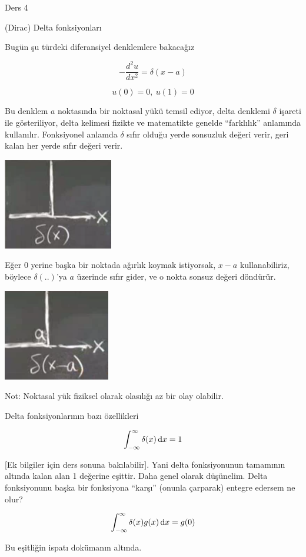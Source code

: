 \documentclass[12pt,fleqn]{article}\usepackage{../../common}
\begin{document}
Ders 4

(Dirac) Delta fonksiyonları

Bugün şu türdeki diferansiyel denklemlere bakacağız

$$ -\frac{d^2u}{dx^2}=\delta(x-a) $$

$$ u(0) = 0, \ u(1) = 0 $$

Bu denklem $a$ noktasında bir noktasal yükü temsil ediyor, delta denklemi
$\delta$ işareti ile gösteriliyor, delta kelimesi fizikte ve matematikte
genelde ``farklılık'' anlamında kullanılır. Fonksiyonel anlamda $\delta$
sıfır olduğu yerde sonsuzluk değeri verir, geri kalan her yerde sıfır
değeri verir.

\includegraphics[height=4cm]{4_1.png}

Eğer 0 yerine başka bir noktada ağırlık koymak istiyorsak, $x-a$
kullanabiliriz, böylece $\delta(..)$'ya $a$ üzerinde sıfır gider, ve o
nokta sonsuz değeri döndürür.

\includegraphics[height=4cm]{4_2.png} 

Not: Noktasal yük fiziksel olarak olasılığı az bir olay olabilir. 

Delta fonksiyonlarının bazı özellikleri

$$ \int_{-\infty}^{\infty} \delta(x) \,\mathrm{d} x = 1 $$

[Ek bilgiler için ders sonuna bakılabilir]. Yani delta fonksiyonunun tamamının
altında kalan alan 1 değerine eşittir. Daha genel olarak düşünelim. Delta
fonksiyonunu başka bir fonksiyona ``karşı'' (onunla çarparak) entegre edersem ne
olur?

$$ \int_{-\infty}^{\infty} \delta(x)g(x) \,\mathrm{d} x = g(0)$$

Bu eşitliğin ispatı dokümanın altında.
\end{document}
